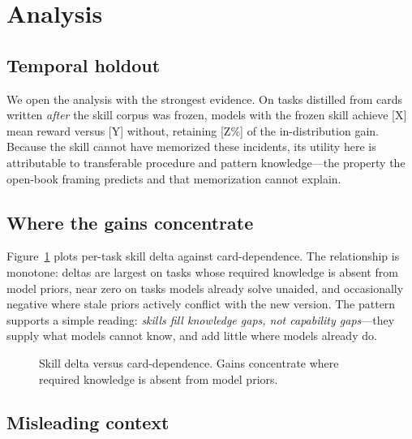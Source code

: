\documentclass[11pt]{article}
\begin{document}
\section{Analysis}
\label{sec:analysis}

\subsection{Temporal holdout}
\label{sec:holdout}

We open the analysis with the strongest evidence.
On tasks distilled from cards written \emph{after} the skill corpus was frozen, models with the frozen skill achieve [X] mean reward versus [Y] without, retaining [Z\%] of the in-distribution gain.
Because the skill cannot have memorized these incidents, its utility here is attributable to transferable procedure and pattern knowledge---the property the open-book framing predicts and that memorization cannot explain.

\subsection{Where the gains concentrate}
\label{sec:where-gains}

Figure~\ref{fig:dependence} plots per-task skill delta against card-dependence.
The relationship is monotone: deltas are largest on tasks whose required knowledge is absent from model priors, near zero on tasks models already solve unaided, and occasionally negative where stale priors actively conflict with the new version.
The pattern supports a simple reading: \emph{skills fill knowledge gaps, not capability gaps}---they supply what models cannot know, and add little where models already do.

\begin{figure}[t]
\centering
{}
\caption{Skill delta versus card-dependence. Gains concentrate where required knowledge is absent from model priors.}
\label{fig:dependence}
\end{figure}

\subsection{Misleading context}
\label{sec:misleading}
\end{document}
